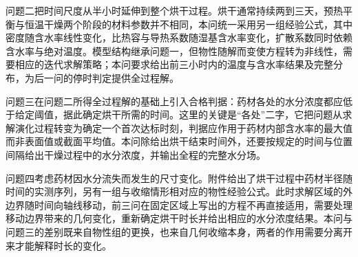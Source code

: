 问题二把时间尺度从半小时延伸到整个烘干过程。烘干通常持续两到三天，预热平衡与恒温干燥两个阶段的材料参数并不相同，本问统一采用另一组经验公式，其中密度随含水率线性变化，比热容与导热系数随湿基含水率变化，扩散系数同时依赖含水率与绝对温度。模型结构继承问题一，但物性随解而变使方程转为非线性，需要相应的迭代求解策略；本问要求给出前三小时内的温度与含水率结果及完整分布，为后一问的停时判定提供全过程解。

问题三在问题二所得全过程解的基础上引入合格判据：药材各处的水分浓度都应低于给定阈值，据此确定烘干所需的时间。这里的关键是“各处”二字，它把问题从求解演化过程转变为确定一个首次达标时刻，判据应作用于药材内部含水率的最大值而非表面值或截面平均值。本问除给出烘干结束时间外，还要按规定的时间与位置间隔给出干燥过程中的水分浓度，并输出全程的完整水分场。

问题四考虑药材因水分流失而发生的尺寸变化。附件给出了烘干过程中药材半径随时间的实测序列，另有一组与收缩情形相对应的物性经验公式。此时求解区域的外边界随时间向轴线移动，前三问在固定区域上写出的方程不再直接适用，需要处理移动边界带来的几何变化，重新确定烘干时长并给出相应的水分浓度结果。本问与问题三的差别既来自物性组的更换，也来自几何收缩本身，两者的作用需要分离开来才能解释时长的变化。
